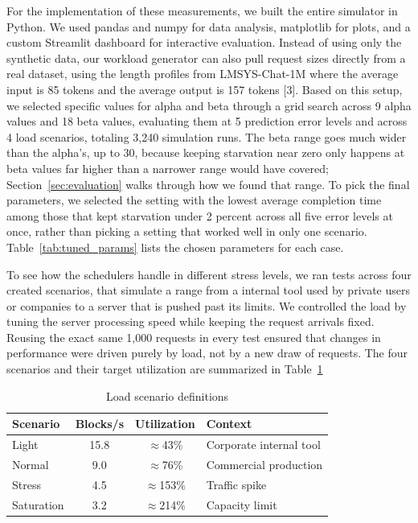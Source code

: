 For the implementation of these measurements, we built the entire simulator in Python. We used pandas and numpy for data analysis, matplotlib for plots, and a custom Streamlit dashboard for interactive evaluation. Instead of using only the synthetic data, our workload generator can also pull request sizes directly from a real dataset, using the length profiles from LMSYS-Chat-1M where the average input is 85 tokens and the average output is 157 tokens [3].
Based on this setup, we selected specific values for alpha and beta through a grid search across 9 alpha values and 18 beta values, evaluating them at 5 prediction error levels and across 4 load scenarios, totaling 3,240 simulation runs. The beta range goes much wider than the alpha's, up to 30, because keeping starvation near zero only happens at beta values far higher than a narrower range would have covered; Section~\ref{sec:evaluation} walks through how we found that range. To pick the final parameters, we selected the setting with the lowest average completion time among those that kept starvation under 2 percent across all five error levels at once, rather than picking a setting that worked well in only one scenario. Table~\ref{tab:tuned_params} lists the chosen parameters for each case.

To see how the schedulers handle in different stress levels, we ran tests across four created scenarios, that simulate a range from a internal tool used by private users or companies to a server that is pushed past its limits. We controlled the load by tuning the server processing speed while keeping the request arrivals fixed. Reusing the exact same 1,000 requests in every test ensured that changes in performance were driven purely by load, not by a new draw of requests. The four scenarios and their target utilization are summarized in Table~\ref{tab:scenarios}

\begin{table}[h]
\centering
\caption{Load scenario definitions}
\label{tab:scenarios}
\begin{tabular}{@{}lccl@{}}
\toprule
Scenario & Blocks/s & Utilization & Context \\
\midrule
Light      & 15.8 & $\approx$43\%  & Corporate internal tool \\
Normal     & 9.0  & $\approx$76\%  & Commercial production \\
Stress     & 4.5  & $\approx$153\% & Traffic spike \\
Saturation & 3.2  & $\approx$214\% & Capacity limit \\
\bottomrule
\end{tabular}
\end{table}

